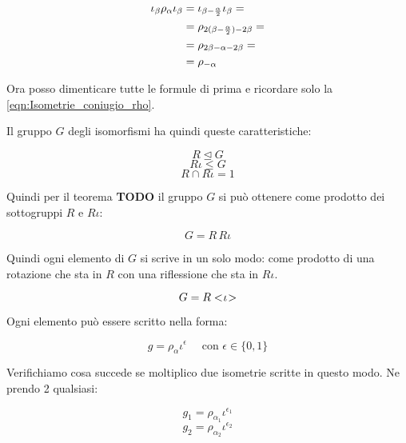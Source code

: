 \begin{align}
	\iota_\beta \rho_\alpha \iota_\beta 
	& = \iota_{\beta-\frac{\alpha}{2}} \iota_\beta = \notag \\
	& = \rho_{2(\beta-\frac{\alpha}{2}) - 2\beta} = \notag \\
	& = \rho_{2\beta-\alpha - 2\beta} = \notag \\
	\label{eqn:Isometrie_coniugio_rho}
	& = \rho_{-\alpha}
\end{align}

Ora posso dimenticare tutte le formule di prima e ricordare solo la \eqref{eqn:Isometrie_coniugio_rho}.

Il gruppo $G$ degli isomorfismi ha quindi queste caratteristiche:

\begin{equation}
	R \unlhd G
\end{equation}
\begin{equation}
	R\iota \le G
\end{equation}
\begin{equation}
	R \cap R\iota = 1
\end{equation}

Quindi per il teorema \textbf{TODO} il gruppo $G$ si può ottenere come prodotto dei sottogruppi $R$ e $R\iota$:

\begin{equation}
	G = R \, R\iota
\end{equation}

Quindi ogni elemento di $G$ si scrive in un solo modo: come prodotto di una rotazione che sta in $R$ con una riflessione che sta in $R\iota$.

\begin{equation}
	G = R< \negmedspace \iota \negmedspace >
\end{equation}

Ogni elemento può essere scritto nella forma:

\begin{equation}
	g = \rho_\alpha \iota^\epsilon \quad\text{ con } \epsilon \in \{0,1\}
\end{equation}

Verifichiamo cosa succede se moltiplico due isometrie scritte in questo modo. Ne prendo 2 qualsiasi:

\begin{equation}
	g_1 = \rho_{\alpha_1} \iota^{\epsilon_1}
\end{equation}
\begin{equation}
	g_2 = \rho_{\alpha_2} \iota^{\epsilon_2}
\end{equation}

